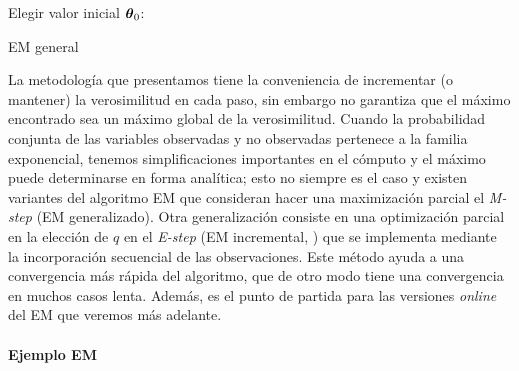 \begin{algorithm}[H]\label{algo:general_EM}
    Elegir valor inicial $\mbox{\boldmath$ \theta $}_0$: \\
\caption{EM general}
\end{algorithm}

La metodología que presentamos tiene la conveniencia de incrementar (o mantener) la verosimilitud en cada paso, sin embargo no garantiza que el máximo encontrado sea un máximo global de la verosimilitud. Cuando la probabilidad conjunta de las variables observadas y no observadas pertenece a la familia exponencial, tenemos simplificaciones importantes en el cómputo y el máximo puede determinarse en forma analítica; esto no siempre es el caso y existen variantes del algoritmo EM que consideran hacer una maximización parcial el \textit{M-step} (EM generalizado). Otra generalización consiste en una optimización parcial en la elección de $q$ en el \textit{E-step} (EM incremental, \cite{Neal1998}) que se implementa mediante la incorporación secuencial de las observaciones. Este método ayuda a una convergencia más rápida del algoritmo, que de otro modo tiene una convergencia en muchos casos lenta. Además, es el punto de partida para las versiones \textit{online} del EM que veremos más adelante.

\paragraph{Ejemplo EM}

